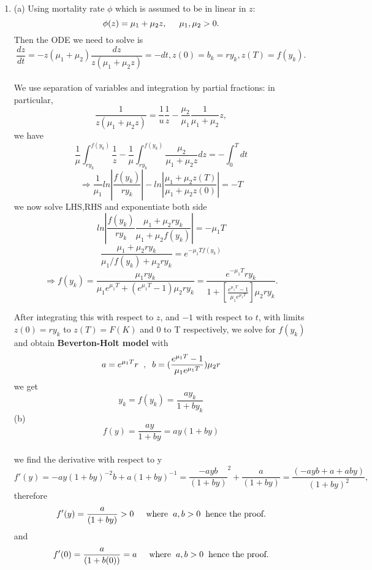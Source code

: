 \documentclass[12pt]{article}
\begin{document}
\begin{enumerate}
\cleardoublepage

\item (a) Using mortality rate $\phi$ which is assumed to be in linear in $z$:
\[\phi(z)=\mu_1+\mu_2z, \hspace{0.5cm}\mu_1,\mu_2>0.\]
Then the ODE we need to solve is
\[\frac{dz}{dt}=-z(\mu_1+\mu_2) \frac{dz}{z(\mu_1+\mu_2z)}=-dt, z(0)=b_k=ry_k, z(T)=f(y_k).\]\\
We use separation of variables and integration by partial fractions: in particular,\\
\[\frac{1}{z(\mu_1+\mu_2z)}=\frac{1}{u}\frac{1}{z}-\frac{\mu_2}{\mu_1}\frac{1}{\mu_1+\mu_2}z,\]
we have
\[\frac{1}{\mu}\int^{f(y_k)}_{ry_k}\frac{1}{z}-\frac{1}{\mu}\int^{f(y_k)}_{ry_k}\frac{\mu_2}{\mu_1+\mu_2z}dz=-\int^T_0dt\]
\[\Rightarrow \frac{1}{\mu_1}ln\left|\frac{f(y_k)}{ry_k}\right|-ln\left|\frac{\mu_1+\mu_2z(T)}{\mu_1+\mu_2z(0)}\right|=-T\]
we now solve LHS,RHS and exponentiate both side
\[ln\left|\frac{f(y_k)}{ry_k}\frac{\mu_1+\mu_2ry_k}{\mu_1+\mu_2f(y_k)}\right|=-\mu_1T\]
\[\frac{\mu_1+\mu_2ry_k}{\mu_1/f(y_k)+\mu_2ry_k}=e^{-\mu_1Tf(y_k)}\]
\[\Rightarrow f(y_k)=\frac{\mu_1ry_k}{\mu_1e^{\mu_1T}+(e^{\mu_1T}-1)\mu_2ry_k}=\frac {e^{-\mu_1T}ry_k}{1+[\frac {e^{\mu_1T}-1}{\mu_1e^{\mu_1T}}]\mu_2ry_k}.\]

After integrating this with respect to $z$, and $-1$ with respect to $t$, with limits $z(0)=ry_k$ to $z(T)=F(K)$ and $0$ to T respectively, we solve for $f(y_k)$ and obtain \textbf{Beverton-Holt model} with
\[a=e^{\mu_1T}r\hspace{0.2cm},\hspace{0.2cm}b=(\frac {e^{\mu_1T}-1}{\mu_1e^{\mu_1T}})\mu_2r\]
we get
\[\boxed{y_k=f(y_k)=\frac{ay_k}{1+by_k}}\]
(b)\[f(y)=\frac{ay}{1+by}=ay(1+by)\]\\
we find the derivative with respect to y
\[f'(y)=-ay(1+by)^{-2}b+a(1+by)^{-1}=\frac{-ayb}{(1+by)}^2+\frac{a}{(1+by)}=\frac{(-ayb+a+aby)}{(1+by)^2},\]
therefore
\[f'(y)=\frac{a}{(1+by)}>0\hspace{0.5cm} \mbox{where}\hspace{0.2cm} a,b>0\hspace{0.2cm}\mbox{hence the proof}.\]
and  
\[f'(0)=\frac{a}{(1+b(0))}=a\hspace{0.5cm} \mbox{where} \hspace{0.2cm}a,b>0\hspace{0.2cm} \mbox{hence the proof}.\]



\cleardoublepage


\end{enumerate}
\end{document}

